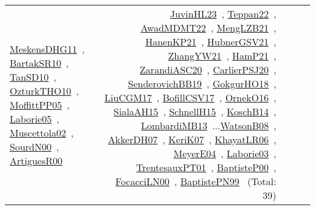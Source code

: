 {\begin{longtable}{p{3cm}r>{\raggedright\arraybackslash}p{6cm}>{\raggedright\arraybackslash}p{6cm}>{\raggedright\arraybackslash}p{8cm}}
\href{../works/MeskensDHG11.pdf}{MeskensDHG11}~\cite{MeskensDHG11}, \href{../works/BartakSR10.pdf}{BartakSR10}~\cite{BartakSR10}, \href{../works/TanSD10.pdf}{TanSD10}~\cite{TanSD10}, \href{../works/OzturkTHO10.pdf}{OzturkTHO10}~\cite{OzturkTHO10}, \href{../works/MoffittPP05.pdf}{MoffittPP05}~\cite{MoffittPP05}, \href{../works/Laborie05.pdf}{Laborie05}~\cite{Laborie05}, \href{../works/Muscettola02.pdf}{Muscettola02}~\cite{Muscettola02}, \href{../works/SourdN00.pdf}{SourdN00}~\cite{SourdN00}, \href{../works/ArtiguesR00.pdf}{ArtiguesR00}~\cite{ArtiguesR00} & \href{../works/JuvinHL23.pdf}{JuvinHL23}~\cite{JuvinHL23}, \href{../works/Teppan22.pdf}{Teppan22}~\cite{Teppan22}, \href{../works/AwadMDMT22.pdf}{AwadMDMT22}~\cite{AwadMDMT22}, \href{../works/MengLZB21.pdf}{MengLZB21}~\cite{MengLZB21}, \href{../works/HanenKP21.pdf}{HanenKP21}~\cite{HanenKP21}, \href{../works/HubnerGSV21.pdf}{HubnerGSV21}~\cite{HubnerGSV21}, \href{../works/ZhangYW21.pdf}{ZhangYW21}~\cite{ZhangYW21}, \href{../works/HamP21.pdf}{HamP21}~\cite{HamP21}, \href{../works/ZarandiASC20.pdf}{ZarandiASC20}~\cite{ZarandiASC20}, \href{../works/CarlierPSJ20.pdf}{CarlierPSJ20}~\cite{CarlierPSJ20}, \href{../works/SenderovichBB19.pdf}{SenderovichBB19}~\cite{SenderovichBB19}, \href{../works/GokgurHO18.pdf}{GokgurHO18}~\cite{GokgurHO18}, \href{../works/LiuCGM17.pdf}{LiuCGM17}~\cite{LiuCGM17}, \href{../works/BofillCSV17.pdf}{BofillCSV17}~\cite{BofillCSV17}, \href{../works/OrnekO16.pdf}{OrnekO16}~\cite{OrnekO16}, \href{../works/SialaAH15.pdf}{SialaAH15}~\cite{SialaAH15}, \href{../works/SchnellH15.pdf}{SchnellH15}~\cite{SchnellH15}, \href{../works/KoschB14.pdf}{KoschB14}~\cite{KoschB14}, \href{../works/LombardiMB13.pdf}{LombardiMB13}~\cite{LombardiMB13}...\href{../works/WatsonB08.pdf}{WatsonB08}~\cite{WatsonB08}, \href{../works/AkkerDH07.pdf}{AkkerDH07}~\cite{AkkerDH07}, \href{../works/KeriK07.pdf}{KeriK07}~\cite{KeriK07}, \href{../works/KhayatLR06.pdf}{KhayatLR06}~\cite{KhayatLR06}, \href{../works/MeyerE04.pdf}{MeyerE04}~\cite{MeyerE04}, \href{../works/Laborie03.pdf}{Laborie03}~\cite{Laborie03}, \href{../works/TrentesauxPT01.pdf}{TrentesauxPT01}~\cite{TrentesauxPT01}, \href{../works/BaptisteP00.pdf}{BaptisteP00}~\cite{BaptisteP00}, \href{../works/FocacciLN00.pdf}{FocacciLN00}~\cite{FocacciLN00}, \href{../works/BaptistePN99.pdf}{BaptistePN99}~\cite{BaptistePN99} (Total: 39)\\

\end{longtable}}
